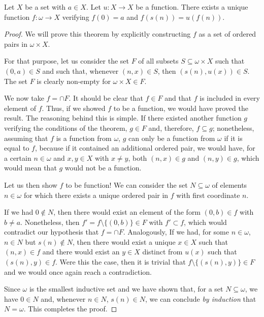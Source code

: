 \begin{theorem}
Let $X$ be a set with $a \in X$. Let $u:X\longrightarrow X$ be a function. There exists a unique function $f:\omega \longrightarrow X$ verifying $f(0) = a$ and $f(s(n)) = u(f(n))$.
\label{<+label+>}
\end{theorem}

\begin{proof}
We will prove this theorem by explicitly constructing $f$ as a set of ordered pairs in $\omega\times X$.

For that purpose, let us consider the set $F$ of all subsets $S\subseteq \omega \times X$ such that $(0,a)\in S$ and such that, whenever $(n,x)\in S$, then $(s(n),u(x)) \in S$.
The set $F$ is clearly non-empty for $\omega \times X\in F$.

We now take $f = \cap F$.
It should be clear that $f\in F$ and that $f$ is included in every element of $f$.
Thus, if we showed $f$ to be a function, we would have proved the result.
The reasoning behind this is simple.
If there existed another function $g$ verifying the conditions of the theorem, $g\in F$ and, therefore, $f\subseteq g$; nonetheless, assuming that $f$ is a function from $\omega$, $g$ can only be a function from $\omega$ if it is equal to $f$, because if it contained an additional ordered pair, we would have, for a certain $n\in \omega$ and $x,y\in X$ with $x\neq y$, both $(n,x)\in g$ and $(n,y)\in g$, which would mean that $g$ would not be a function.

Let us then show $f$ to be function! We can consider the set $N\subseteq \omega$ of elements $n\in \omega$ for which there exists a unique ordered pair in $f$ with first coordinate $n$.

If we had $0\not\in N$, then there would exist an element of the form $(0,b)\in f$ with $b\neq a$. Nonetheless, then $f' = f\setminus \{(0,b)\}\in F$ with $f'\subset f$, which would contradict our hypothesis that $f = \cap F$.
Analogously, If we had, for some $n\in \omega$, $n\in N$ but $s(n)\not\in N$, then there would exist a unique $x\in X$ such that $(n,x)\in f$ and there would exist an $y \in X$ distinct from $u(x)$ such that $(s(n), y)\in f$.
Were this the case, then it is trivial that $f\setminus \{(s(n),y)\}\in F$ and we would once again reach a contradiction.

Since $\omega$ is the smallest inductive set and we have shown that, for a set $N\subseteq \omega$, we have $0\in N$ and, whenever $n\in N$, $s(n) \in N$, we can conclude \emph{by induction} that $N = \omega$. This completes the proof. 
\end{proof}

